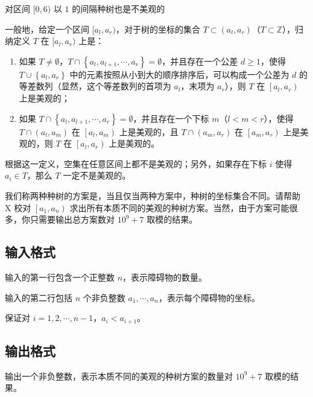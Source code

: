 对区间 $[0, 6)$ 以 $1$ 的间隔种树也是不美观的

一般地，给定一个区间 $[a_l, a_r)$，对于树的坐标的集合 $T\subset(a_l, a_r)$（$T\subset\mathbb{Z}$），归纳定义 $T$ 在 $[a_l, a_r)$ 上是{}：

\begin{enumerate}

    \item 如果 $T\ne \emptyset$，$T\cap \left\{a_l, a_{l+1}, \cdots, a_r\right\}=\emptyset$，并且存在一个公差 $d\ge 1$，使得 $T\cup\left\{a_l, a_r\right\}$ 中的元素按照从小到大的顺序排序后，可以构成一个公差为 $d$ 的等差数列（显然，这个等差数列的首项为 $a_l$，末项为 $a_r$），则 $T$ 在 $\left[a_l, a_r\right)$ 上是美观的；

    \item 如果 $T\cap \left\{a_l, a_{l+1}, \cdots, a_r\right\}=\emptyset$，并且存在一个下标 $m$（$l<m<r$），使得 $T\cap\left(a_l, a_m\right)$ 在 $\left[a_l, a_m\right)$ 上是美观的，且 $T\cap\left(a_m, a_r\right)$ 在 $\left[a_m, a_r\right)$ 上是美观的，则 $T$ 在 $\left[a_l, a_r\right)$ 上是美观的。

\end{enumerate}

根据这一定义，空集在任意区间上都不是美观的；另外，如果存在下标 $i$ 使得 $a_i \in T$，那么 $T$ 一定不是美观的。

我们称两种种树的方案是{}，当且仅当两种方案中，种树的坐标集合不同。请帮助 X 校对 $\left[a_1, a_n\right)$ 求出所有本质不同的美观的种树方案。当然，由于方案可能很多，你只需要输出总方案数对 $10^9+7$ 取模的结果。


\subsection*{输入格式}

输入的第一行包含一个正整数 $n$，表示障碍物的数量。

输入的第二行包括 $n$ 个非负整数 $a_1, \cdots, a_n$，表示每个障碍物的坐标。

保证对 $i=1, 2, \cdots, n-1$，$a_i < a_{i+1}$。


\subsection*{输出格式}

输出一个非负整数，表示本质不同的美观的种树方案的数量对 $10^9+7$ 取模的结果。

\examplebox*{}{}

